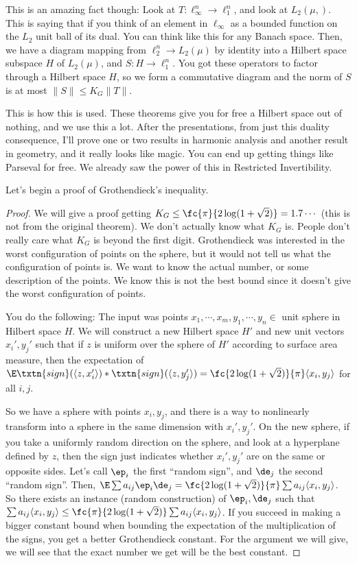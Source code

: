 This is an amazing fact though: Look at $T: \ell_{\infty}^n \to \ell_1^n$, and look at $L_2(\mu, )$. This is saying that if you think of an element in $\ell_{\infty}$ as a bounded function on the $L_2$ unit ball of its dual. You can think like this for any Banach space. Then, we have a diagram mapping from $\ell_2^n \to L_2(\mu)$ by identity into a Hilbert space subspace $H$ of $L_2(\mu)$, and $S: H \to \ell_1^n$. You got these operators to factor through a Hilbert space $H$, so we form a commutative diagram and the norm of $S$ is at most $\|S\| \leq K_G\|T\|$. 

This is how this is used. These theorems give you for free a Hilbert space out of nothing, and we use this a lot. After the presentations, from just this duality consequence, I'll prove one or two results in harmonic analysis and another result in geometry, and it really looks like magic. You can end up getting things like Parseval for free. We already saw the power of this in Restricted Invertibility. 

Let's begin a proof of Grothendieck's inequality. 
\begin{proof}
We will give a proof getting $K_G \leq \fc{\pi}{2\log(1 + \sqrt{2})} = 1.7\cdots$ (this is not from the original theorem). We don't actually know what $K_G$ is. People don't really care what $K_G$ is beyond the first digit. 
Grothendieck was interested in the worst configuration of points on the sphere, but it would not tell us what the configuration of points is. We want to know the actual number, or some description of the points. We know this is not the best bound since it doesn't give the worst configuration of points. 

You do the following: The input was points $x_1, \cdots, x_m, y_1, \cdots, y_n \in $ unit sphere in Hilbert space $H$. We will construct a new Hilbert space $H'$ and new unit vectors $x_i', y_j'$ such that if $z$ is uniform over the sphere of $H'$ according to surface area measure, then the expectation of $\E\txtn{sign}(\langle z, x_i' \rangle) *\txtn{sign}(\langle z, y_j'\rangle) = \fc{2\log(1 + \sqrt{2})}{\pi} \langle x_i, y_j \rangle$ for all $i, j$. 

So we have a sphere with points $x_i, y_j$, and there is a way to nonlinearly transform into a sphere in the same dimension with $x_i', y_j'$. On the new sphere, if you take a uniformly random direction on the sphere, and look at a hyperplane defined by $z$, then the sign just indicates whether $x_i', y_j'$ are on the same or opposite sides. Let's call $\ep_i$ the first ``random sign'', and $\de_j$ the second ``random sign''. Then, $\E \sum a_{ij} \ep_i\de_j = \fc{2\log (1 + \sqrt{2})}{\pi} \sum a_{ij} \langle x_i, y_j \rangle$. So there exists an instance (random construction) of $\ep_i, \de_j$ such that $\sum a_{ij} \langle x_i, y_j \rangle \leq \fc{\pi}{2\log (1 + \sqrt{2})} \sum a_{ij} \langle x_i, y_j \rangle$. If you succeed in making a bigger constant bound when bounding the expectation of the multiplication of the signs, you get a better Grothendieck constant. For the argument we will give, we will see that the exact number we get will be the best constant. 

\end{proof}

